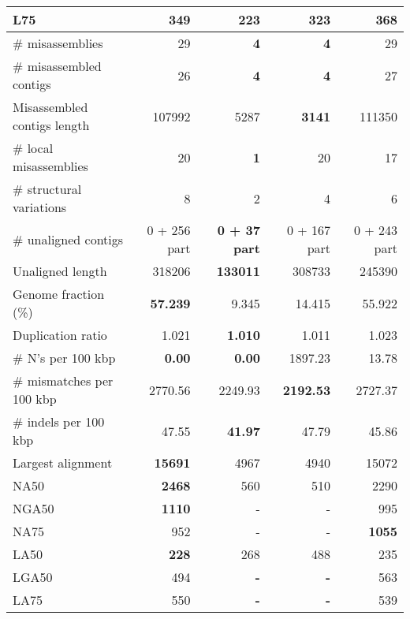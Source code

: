 \documentclass[12pt,a4paper]{article}
\begin{document}
\begin{table}[ht]
\begin{center}
\begin{tabular}{|l*{4}{|r}|}
L75 & 349 & {\bf 223} & 323 & 368 \\ \hline
\# misassemblies & 29 & {\bf 4} & {\bf 4} & 29 \\ \hline
\# misassembled contigs & 26 & {\bf 4} & {\bf 4} & 27 \\ \hline
Misassembled contigs length & 107992 & 5287 & {\bf 3141} & 111350 \\ \hline
\# local misassemblies & 20 & {\bf 1} & 20 & 17 \\ \hline
\# structural variations & 8 & 2 & 4 & 6 \\ \hline
\# unaligned contigs & 0 + 256 part & {\bf 0 + 37 part} & 0 + 167 part & 0 + 243 part \\ \hline
Unaligned length & 318206 & {\bf 133011} & 308733 & 245390 \\ \hline
Genome fraction (\%) & {\bf 57.239} & 9.345 & 14.415 & 55.922 \\ \hline
Duplication ratio & 1.021 & {\bf 1.010} & 1.011 & 1.023 \\ \hline
\# N's per 100 kbp & {\bf 0.00} & {\bf 0.00} & 1897.23 & 13.78 \\ \hline
\# mismatches per 100 kbp & 2770.56 & 2249.93 & {\bf 2192.53} & 2727.37 \\ \hline
\# indels per 100 kbp & 47.55 & {\bf 41.97} & 47.79 & 45.86 \\ \hline
Largest alignment & {\bf 15691} & 4967 & 4940 & 15072 \\ \hline
NA50 & {\bf 2468} & 560 & 510 & 2290 \\ \hline
NGA50 & {\bf 1110} & - & - & 995 \\ \hline
NA75 & 952 & - & - & {\bf 1055} \\ \hline
LA50 & {\bf 228} & 268 & 488 & 235 \\ \hline
LGA50 & 494 & {\bf -} & {\bf -} & 563 \\ \hline
LA75 & 550 & {\bf -} & {\bf -} & 539 \\ \hline
\end{tabular}
\end{center}
\end{table}
\end{document}
